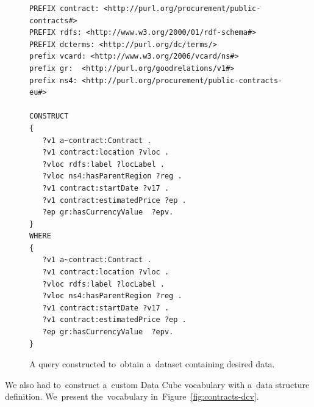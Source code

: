 \begin{figure}
  \scriptsize
  \begin{verbatim}
PREFIX contract: <http://purl.org/procurement/public-contracts#>
PREFIX rdfs: <http://www.w3.org/2000/01/rdf-schema#>
PREFIX dcterms: <http://purl.org/dc/terms/>
prefix vcard: <http://www.w3.org/2006/vcard/ns#> 
prefix gr:	<http://purl.org/goodrelations/v1#> 
prefix ns4:	<http://purl.org/procurement/public-contracts-eu#>

CONSTRUCT 
{
   ?v1 a~contract:Contract .
   ?v1 contract:location ?vloc .
   ?vloc rdfs:label ?locLabel .
   ?vloc ns4:hasParentRegion ?reg .
   ?v1 contract:startDate ?v17 .
   ?v1 contract:estimatedPrice ?ep .
   ?ep gr:hasCurrencyValue	?epv.
}
WHERE
{
   ?v1 a~contract:Contract .
   ?v1 contract:location ?vloc .
   ?vloc rdfs:label ?locLabel .
   ?vloc ns4:hasParentRegion ?reg .
   ?v1 contract:startDate ?v17 .
   ?v1 contract:estimatedPrice ?ep .
   ?ep gr:hasCurrencyValue	?epv.
}
  \end{verbatim}
  \caption{A query constructed to~obtain a~dataset containing desired data.}
  \label{fig:contracts-query}
\end{figure}

We also had to~construct a~custom Data Cube vocabulary with a~data structure 
definition. We~present the~vocabulary in~Figure~\ref{fig:contracts-dcv}.

